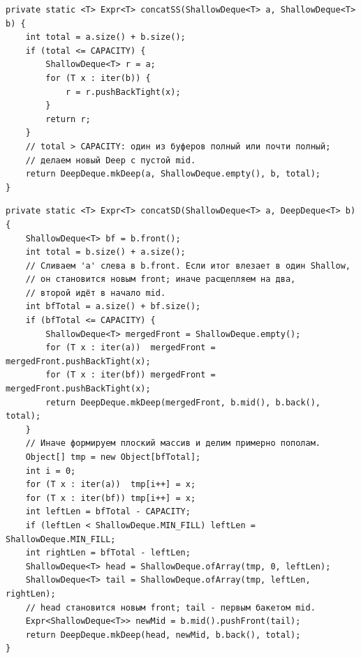 \begin{longlisting}
\caption{concatSS: оба операнда ShallowDeque}\label{lst:concat-ss}
\begin{verbatim}
private static <T> Expr<T> concatSS(ShallowDeque<T> a, ShallowDeque<T> b) {
    int total = a.size() + b.size();
    if (total <= CAPACITY) {
        ShallowDeque<T> r = a;
        for (T x : iter(b)) {
            r = r.pushBackTight(x);
        }
        return r;
    }
    // total > CAPACITY: один из буферов полный или почти полный;
    // делаем новый Deep с пустой mid.
    return DeepDeque.mkDeep(a, ShallowDeque.empty(), b, total);
}
\end{verbatim}
\end{longlisting}

\begin{longlisting}
\caption{concatSD: ShallowDeque + DeepDeque}\label{lst:concat-sd}
\begin{verbatim}
private static <T> Expr<T> concatSD(ShallowDeque<T> a, DeepDeque<T> b) {
    ShallowDeque<T> bf = b.front();
    int total = b.size() + a.size();
    // Сливаем 'a' слева в b.front. Если итог влезает в один Shallow,
    // он становится новым front; иначе расщепляем на два,
    // второй идёт в начало mid.
    int bfTotal = a.size() + bf.size();
    if (bfTotal <= CAPACITY) {
        ShallowDeque<T> mergedFront = ShallowDeque.empty();
        for (T x : iter(a))  mergedFront = mergedFront.pushBackTight(x);
        for (T x : iter(bf)) mergedFront = mergedFront.pushBackTight(x);
        return DeepDeque.mkDeep(mergedFront, b.mid(), b.back(), total);
    }
    // Иначе формируем плоский массив и делим примерно пополам.
    Object[] tmp = new Object[bfTotal];
    int i = 0;
    for (T x : iter(a))  tmp[i++] = x;
    for (T x : iter(bf)) tmp[i++] = x;
    int leftLen = bfTotal - CAPACITY;
    if (leftLen < ShallowDeque.MIN_FILL) leftLen = ShallowDeque.MIN_FILL;
    int rightLen = bfTotal - leftLen;
    ShallowDeque<T> head = ShallowDeque.ofArray(tmp, 0, leftLen);
    ShallowDeque<T> tail = ShallowDeque.ofArray(tmp, leftLen, rightLen);
    // head становится новым front; tail - первым бакетом mid.
    Expr<ShallowDeque<T>> newMid = b.mid().pushFront(tail);
    return DeepDeque.mkDeep(head, newMid, b.back(), total);
}
\end{verbatim}
\end{longlisting}

